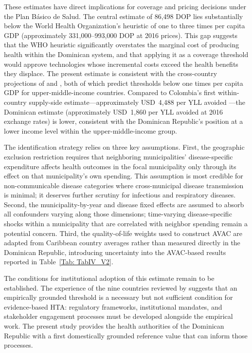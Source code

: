 \documentclass[11pt]{article}
\numberwithin{equation}{section}
\theoremstyle{remark}
\begin{document}
These estimates have direct implications for coverage and pricing decisions under the Plan Básico de Salud. The central estimate of 86,498 DOP lies substantially below the World Health Organization's heuristic of one to three times per capita GDP (approximately 331,000--993,000 DOP at 2016 prices). This gap suggests that the WHO heuristic significantly overstates the marginal cost of producing health within the Dominican system, and that applying it as a coverage threshold would approve technologies whose incremental costs exceed the health benefits they displace. The present estimate is consistent with the cross-country projections of \citet{Woods2016} and \citet{PichonRiviere2023}, both of which predict thresholds below one times per capita GDP for upper-middle-income countries. Compared to Colombia's first within-country supply-side estimate---approximately USD~4,488 per YLL avoided \parencite{Espinosa2021}---the Dominican estimate (approximately USD~1,860 per YLL avoided at 2016 exchange rates) is lower, consistent with the Dominican Republic's position at a lower income level within the upper-middle-income group.

The identification strategy relies on three key assumptions. First, the geographic exclusion restriction requires that neighboring municipalities' disease-specific expenditure affects health outcomes in the focal municipality only through its effect on that municipality's own spending. This assumption is most credible for non-communicable disease categories where cross-municipal disease transmission is minimal; it deserves further scrutiny for infectious and respiratory diseases. Second, the municipality-by-year and disease fixed effects are assumed to absorb all confounders varying along those dimensions; time-varying disease-specific shocks within a municipality that are correlated with neighbor spending remain a potential concern. Third, the quality-of-life weights used to construct AVAC are adapted from Caribbean country averages rather than measured directly in the Dominican Republic, introducing uncertainty into the AVAC-based results reported in Table~\ref{Tab: TabIV_V2}.

The conditions for institutional adoption of this estimate remain to be established. The experience of the nine countries reviewed by \citet{Espinosa2024} suggests that an empirically grounded threshold is a necessary but not sufficient condition for evidence-based HTA: regulatory frameworks, institutional mandates, and stakeholder engagement processes must be developed alongside the empirical work. The present study provides the health authorities of the Dominican Republic with a first domestically grounded reference value that can inform those processes.
\end{document}
